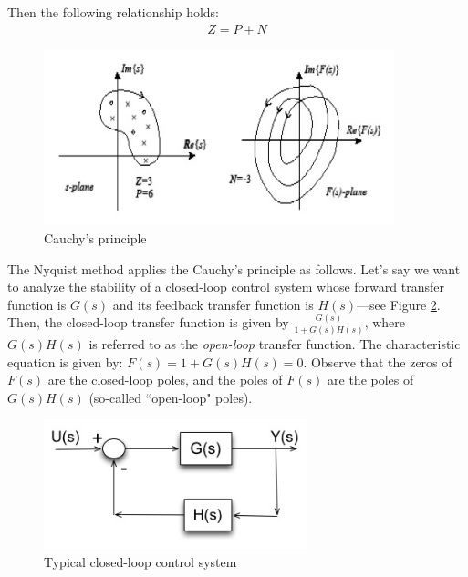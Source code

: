 \documentclass{article}
\begin{document}
Then the following relationship holds:
\begin{eqnarray*}
Z = P + N
\end{eqnarray*}

\begin{figure}[htbp]
   \centering
   \includegraphics[width=4in]{figures/cauchy.jpg} %
   \caption{Cauchy's principle}
   \label{fig:cauchy}
\end{figure}

The Nyquist method applies the Cauchy's principle as follows.
Let's say we want to analyze the stability of a closed-loop control system
whose forward transfer function is $G(s)$ and its feedback transfer function is $H(s)$---see Figure \ref{fig:closed-loop}.
Then, the closed-loop transfer function is given by $\frac{G(s)}{1+G(s) H(s)}$,
where $G(s)H(s)$ is referred to as the {\em open-loop} transfer function.
The characteristic equation is given by: $F(s) = 1 + G(s) H(s) = 0$.
Observe that the zeros of $F(s)$ are the closed-loop poles,
and the poles of $F(s)$ are the poles of $G(s)H(s)$ (so-called ``open-loop" poles).
\begin{figure}[htbp]
   \centering
   \includegraphics[width=3in]{figures/closed-loop.jpg} %
   \caption{Typical closed-loop control system}
   \label{fig:closed-loop}
\end{figure}
\end{document}
